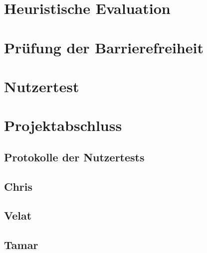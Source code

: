 \documentclass[parskip,10pt,abstracton]{scrartcl}
\begin{document}
\section{Heuristische Evaluation}


\section{Prüfung der Barrierefreiheit}

\section{Nutzertest}

\section{Projektabschluss}



\pagebreak

\begin{appendix}
\section{Protokolle der Nutzertests}

\subsection*{Chris}
\subsection*{Velat}
\subsection*{Tamar}

\end{appendix}
\end{document}
